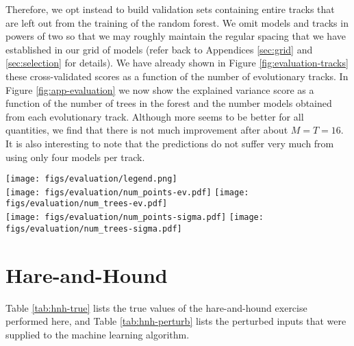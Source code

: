 \documentclass[iop,apj,twocolappendix]{emulateapj}
\begin{document}
Therefore, we opt instead to build validation sets containing entire tracks that are left out from the training of the random forest. We omit models and tracks in powers of two so that we may roughly maintain the regular spacing that we have established in our grid of models (refer back to Appendices \ref{sec:grid} and \ref{sec:selection} for details). We have already shown in Figure \ref{fig:evaluation-tracks} these cross-validated scores as a function of the number of evolutionary tracks. In Figure \ref{fig:app-evaluation} we now show the explained variance score as a function of the number of trees in the forest and the number models obtained from each evolutionary track. Although more seems to be better for all quantities, we find that there is not much improvement after about $M=T=16$. It is also interesting to note that the predictions do not suffer very much from using only four models per track. 

\begin{figure*}
    \centering\texttt{[image: figs/evaluation/legend.png]}\\
    \texttt{[image: figs/evaluation/num\_points-ev.pdf]}\hfill
    \texttt{[image: figs/evaluation/num\_trees-ev.pdf]}\\
    \texttt{[image: figs/evaluation/num\_points-sigma.pdf]}\hfill
    \texttt{[image: figs/evaluation/num\_trees-sigma.pdf]}\\
    \caption{Explained variance (top) and accuracy per precision score (bottom) of each stellar parameter as a function of the number of models per evolutionary track (left) and the number of trees used in training the random forest (right). } 
    \label{fig:app-evaluation}
\end{figure*}


\section{Hare-and-Hound}
\label{sec:hare-and-hound}
Table \ref{tab:hnh-true} lists the true values of the hare-and-hound exercise performed here, and Table \ref{tab:hnh-perturb} lists the perturbed inputs that were supplied to the machine learning algorithm. 
\end{document}
